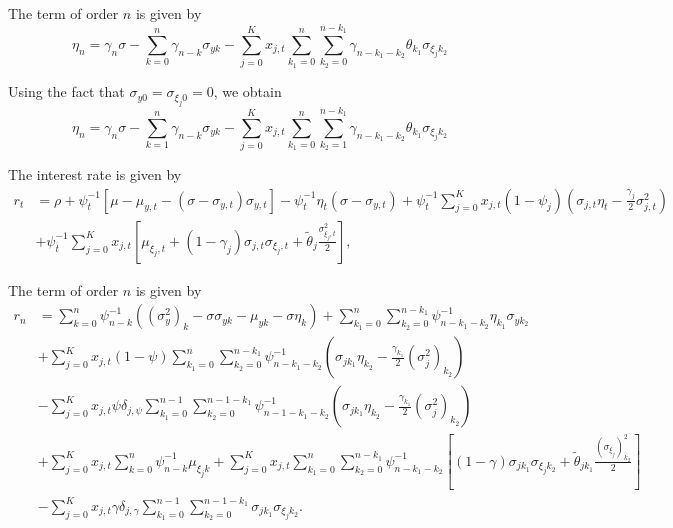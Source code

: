 \documentclass[11pt,english]{article}
\begin{document}
The term of order $n$ is given by
\begin{equation}
    \eta_n = \gamma_n \sigma - \sum_{k=0}^n \gamma_{n-k} \sigma_{yk} - \sum_{j=0}^K x_{j,t} \sum_{k_1=0}^n \sum_{k_2 = 0}^{n-k_1} \gamma_{n-k_1-k_2}  \theta_{k_1} \sigma_{\xi_j k_2}
\end{equation}

Using the fact that $\sigma_{y0} = \sigma_{\xi_j0} = 0$, we obtain
\begin{equation*}
    \eta_n = \gamma_n \sigma - \sum_{k=1}^n \gamma_{n-k} \sigma_{yk} - \sum_{j=0}^K x_{j,t} \sum_{k_1=0}^n \sum_{k_2 = 1}^{n-k_1} \gamma_{n-k_1-k_2}  \theta_{k_1} \sigma_{\xi_j k_2}
\end{equation*}

The interest rate is given by
\begin{align}
    r_t &= \rho + \psi_t^{-1} \left[ \mu - \mu_{y,t} - (\sigma - \sigma_{y,t}) \sigma_{y,t}\right] - \psi_t^{-1}\eta_t (\sigma - \sigma_{y,t}) + \psi_t^{-1}\sum_{j=0}^K x_{j,t}   (1-\psi_j) \left( \sigma_{j,t} \eta_t - \frac{\gamma_j}{2}  \sigma_{j,t}^2    \right)  \nonumber\\
    &+ \psi_t^{-1}\sum_{j=0}^K x_{j,t} \left[ \mu_{\xi_j,t} 
    + (1-\gamma_j) \sigma_{j,t} \sigma_{\xi_j,t}
    + \tilde{\theta}_j \frac{\sigma_{\xi_j,t}^2}{2} \right],
\end{align}

The term of order $n$ is given by
\begin{align}
    r_n &= \sum_{k=0}^n \psi_{n-k}^{-1} \left( (\sigma_y^2)_k - \sigma \sigma_{yk} - \mu_{yk} - \sigma \eta_k \right) + \sum_{k_1=0}^n \sum_{k_2 = 0}^{n-k_1} \psi_{n-k_1-k_2}^{-1} \eta_{k_1} \sigma_{yk_2}\\
    &+\sum_{j=0}^K x_{j,t} (1-\psi) \sum_{k_1=0}^n \sum_{k_2 = 0}^{n-k_1} \psi_{n-k_1-k_2}^{-1}\left( \sigma_{jk_1} \eta_{k_2} - \frac{\gamma_{k_1}}{2} (\sigma_{j}^2)_{k_2} \right)\\
    &-\sum_{j=0}^K x_{j,t} \psi \delta_{j,\psi} \sum_{k_1=0}^{n-1} \sum_{k_2 = 0}^{n-1-k_1} \psi_{n-1-k_1-k_2}^{-1}\left( \sigma_{jk_1} \eta_{k_2} - \frac{\gamma_{k_1}}{2} (\sigma_{j}^2)_{k_2} \right)\\
    &+\sum_{j=0}^K x_{j,t} \sum_{k=0}^n \psi_{n-k}^{-1} \mu_{\xi_jk}
    +\sum_{j=0}^K x_{j,t} \sum_{k_1=0}^n \sum_{k_2=0}^{n-k_1} \psi_{n-k_1-k_2}^{-1} \left[ (1-\gamma) \sigma_{jk_1} \sigma_{\xi_j k_2}+ \tilde{\theta}_{jk_1} \frac{(\sigma_{\xi_j})^2_{k_2}}{2}\right] \\
    &- \sum_{j=0}^K x_{j,t} \gamma \delta_{j,\gamma} \sum_{k_1=0}^{n-1} \sum_{k_2=0}^{n-1-k_1} \sigma_{jk_1} \sigma_{\xi_jk_2}.
\end{align}
\end{document}
